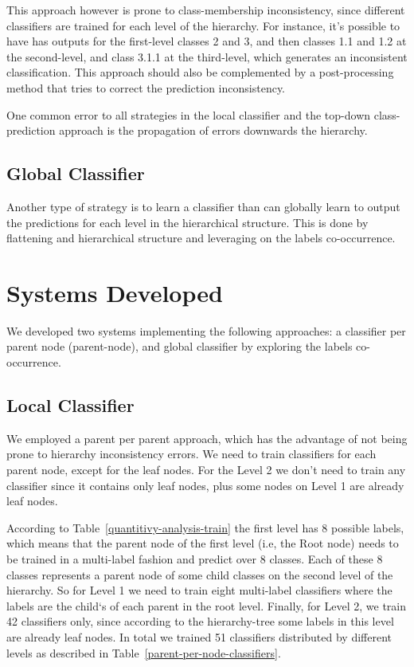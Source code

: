 \documentclass[11pt,a4paper]{article}
\begin{document}
This approach however is prone to class-membership inconsistency, since different classifiers are
trained for each level of the hierarchy. For instance, it's possible to have has outputs for the
first-level classes 2 and 3, and then classes 1.1 and 1.2 at the second-level, and class 3.1.1
at the third-level, which generates an inconsistent classification. This approach should also
be complemented by a post-processing method that tries to correct the prediction inconsistency.

One common error to all strategies in the local classifier and the top-down class-prediction
approach is the propagation of errors downwards the hierarchy.



\subsection{Global Classifier}

Another type of strategy is to learn a classifier than can globally learn to
output the predictions for each level in the hierarchical structure. This is
done by flattening and hierarchical structure and leveraging on the labels
co-occurrence.


\section{Systems Developed}\label{system}

We developed two systems implementing the following approaches: a classifier per
parent node (parent-node), and global classifier by exploring the
labels co-occurrence.


\subsection{Local Classifier}

We employed a parent per parent approach, which has the advantage of not being
prone to hierarchy inconsistency errors. We need to train classifiers for each
parent node, except for the leaf nodes. For the Level 2 we don't need to train
any classifier since it contains only leaf nodes, plus some nodes on Level 1
are already leaf nodes.

According to Table~\ref{quantitivy-analysis-train} the first level has 8 possible
labels, which means that the parent node of the first level (i.e, the Root node)
needs to be trained in a multi-label fashion and predict over 8 classes. Each of
these 8 classes represents a parent node of some child classes on the
second level of the hierarchy. So for Level 1 we need to train eight multi-label
classifiers where the labels are the child`s of each parent in the root level.
Finally, for Level 2, we train 42 classifiers only, since according to the
hierarchy-tree some labels in this level are already leaf nodes. In total we
trained 51 classifiers distributed by different levels as described in
Table~\ref{parent-per-node-classifiers}.
\end{document}
